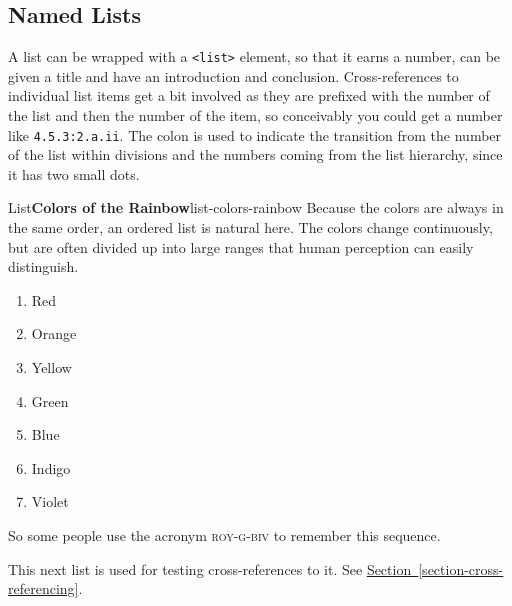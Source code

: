 \documentclass{amsart}
\theoremstyle{plain}%
\theoremstyle{definition}%
\theoremstyle{remark}%
\newcommand{\xreffont}{\relax}
\newcommand{\mono}[1]{\texttt{#1}}
\newcommand{\acronym}[1]{\textsc{\MakeLowercase{#1}}}
\numberwithin{equation}{section}
\begin{document}
\subsection{Named Lists}\label{section-lists-8}%
%
%
A list can be wrapped with a \mono{<list>} element, so that it earns a number, can be given a title and have an introduction and conclusion.  Cross-references to individual list items get a bit involved as they are prefixed with the number of the list and then the number of the item, so conceivably you could get a number like \mono{4.5.3:2.a.ii}.  The colon is used to indicate the transition from the number of the list within divisions and the numbers coming from the list hierarchy, since it has two small dots.%
\begin{listptx}{List}{\textbf{Colors of the Rainbow}}{list-colors-rainbow}{}%
Because the colors are always in the same order, an ordered list is natural here.  The colors change continuously, but are often divided up into large ranges that human perception can easily distinguish.%
%
\begin{enumerate}
\item{}Red%
\item\hypertarget{rainbow-orange}{}Orange%
\item{}Yellow%
\item{}Green%
\item{}Blue%
\item{}Indigo%
\item{}Violet%
\end{enumerate}
So some people use the acronym \acronym{ROY-G-BIV} to remember this sequence.%
\end{listptx}%
This next list is used for testing cross-references to it.  See \hyperref[section-cross-referencing]{Section~{\xreffont\ref{section-cross-referencing}}}.%
\end{document}
